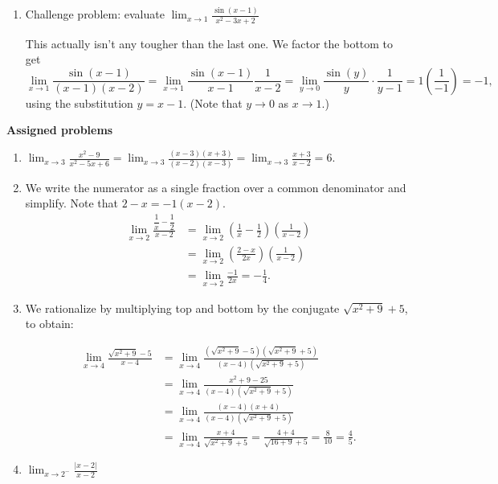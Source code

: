 \documentclass[12pt]{article}
\newcommand{\di}{\displaystyle}
\newcommand{\abs}[1]{\lvert #1\rvert}
\begin{document}
\begin{enumerate}
\item Challenge problem: evaluate $\di\lim_{x\to 1}\frac{\sin(x-1)}{x^2-3x+2}$

This actually isn't any tougher than the last one. We factor the bottom to get
\[
\lim_{x\to 1}\frac{\sin(x-1)}{(x-1)(x-2)}=\lim_{x\to 1}\frac{\sin(x-1)}{x-1}\frac{1}{x-2} = \lim_{y\to 0}\frac{\sin(y)}{y}\cdot \frac{1}{y-1} = 1\left(\frac{1}{-1}\right)=-1,
\]
using the substitution $y=x-1$. (Note that $y\to 0$ as $x\to 1$.)
\end{enumerate}




\textbf{Assigned problems}


  \begin{enumerate}
    \item $\di \lim_{x\to 3}\frac{x^2-9}{x^2-5x+6} = \lim_{x\to 3}\frac{(x-3)(x+3)}{(x-2)(x-3)} = \lim_{x\to 3}\frac{x+3}{x-2}=6.$
    
    \item We write the numerator as a single fraction over a common denominator and simplify. Note that $2-x=-1(x-2)$.
    \begin{align*}
    \lim_{x\to 2}\frac{\dfrac{1}{x}-\dfrac{1}{2}}{x-2} & = \lim_{x\to 2}\left(\frac1x-\frac12\right)\left(\frac{1}{x-2}\right)\\
    & = \lim_{x\to 2}\left(\frac{2-x}{2x}\right)\left(\frac{1}{x-2}\right)\\
    & = \lim_{x\to 2}\frac{-1}{2x} = -\frac14.
    \end{align*} 
    
       
    \item We rationalize by multiplying top and bottom by the conjugate $\sqrt{x^2+9}+5$, to obtain:
    
    \begin{align*} \lim_{x\to 4}\frac{\sqrt{x^2+9}-5}{x-4} &= \lim_{x\to 4}\frac{(\sqrt{x^2+9}-5)(\sqrt{x^2+9}+5)}{(x-4)(\sqrt{x^2+9}+5)} \tag{rationalize}\\
    & = \lim_{x\to 4}\frac{x^2+9-25}{(x-4)(\sqrt{x^2+9}+5)} \tag{multiply out the difference of squares}\\
    & = \lim_{x\to 4}\frac{(x-4)(x+4)}{(x-4)(\sqrt{x^2+9}+5)} \tag{factor $x^2+9-25=x^2-16$}\\
    & = \lim_{x\to 4}\frac{x+4}{\sqrt{x^2+9}+5} = \frac{4+4}{\sqrt{16+9}+5}=\frac{8}{10}=\frac{4}{5}.
   \end{align*}
    
    \item $\di\lim_{x\to 2^-}\frac{\abs{x-2}}{x-2}$
    

\end{enumerate}
\end{document}

